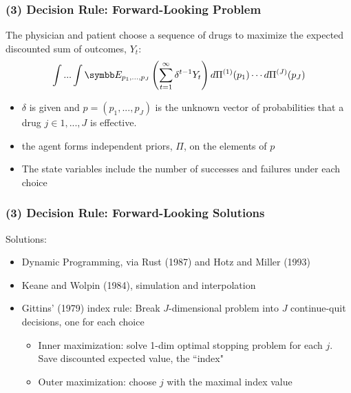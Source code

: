 \documentclass[aspectratio=169,11pt]{beamer}
\begin{document}

\begin{frame}
\frametitle{(3) Decision Rule: Forward-Looking Problem}
\small

The physician and patient choose a sequence of drugs to maximize the
expected discounted sum of outcomes, $Y_{t}$: 
\begin{equation}
\int ...\int \E_{p_{1},...,p_{J}}\left( \sum_{t=1}^{\infty }\delta
^{t-1}Y_{t}\right) d\Pi ^{(1)}(p_{1})\cdots d\Pi ^{(J)}(p_{J})
\label{seq_prob}
\end{equation}

\begin{itemize}
\item $\delta$ is given and $p=(p_{1},...,p_{J})$ is the unknown vector of
probabilities that a drug $j\in{1,...,J}$ is effective.

\item the agent forms independent priors, $\Pi $, on the elements of $p$

\item The state variables include the number of successes and failures under
each choice
\end{itemize}
\end{frame}


\begin{frame}[label=ALTERNATIVES]

\frametitle{(3) Decision Rule: Forward-Looking Solutions}
\small

Solutions:

\begin{itemize}
\item Dynamic Programming, via Rust (1987) and Hotz and Miller (1993)

\item Keane and Wolpin (1984), simulation and interpolation

\item Gittins' (1979) index rule: Break $J$-dimensional problem into $J$
continue-quit decisions, one for each choice

\begin{itemize}
\item Inner maximization: solve 1-dim optimal stopping problem for each $j$.
Save discounted expected value, the ``index"

\item Outer maximization: choose $j$ with the maximal index value
\end{itemize}
\end{itemize}
\end{frame}
\end{document}
